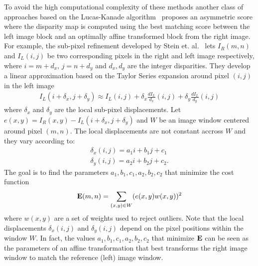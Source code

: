 To avoid the high computational complexity of these methods another
class of approaches based on the Lucas-Kanade
algorithm~\cite{Baker04:lucas-kanade} proposes an asymmetric score
where the disparity map is computed using the best matching score
between the left image block and an optimally affine transformed block
from the right image.  For example, the sub-pixel refinement developed
by Stein et. al.~\cite{Stein06:attenuating} lets $I_R(m,n)$ and
$I_L(i,j)$ be two corresponding pixels in the right and left image
respectively, where $i = m+d_x$, $j = n+d_y$ and $d_x, d_y$ are the
integer disparities.  They develop a linear approximation based on the
Taylor Series expansion around pixel $(i,j)$ in the left image
\begin{eqnarray}
I_L(i+\delta_x,j + \delta_y)\approx I_L(i,j) + \delta_x\frac{dI_L}{d_x}(i,j)+\delta_y\frac{dI_L}{d_y}(i,j) 
\label{taylor_expansion}
\end {eqnarray}
where $\delta_x$ and $\delta_y$ are the local sub-pixel displacements.
Let $e(x,y) = I_R(x,y) - I_L(i+\delta_x,j+\delta_y)$ and $W$ be an
image window centered around pixel $(m,n)$.  The local displacements
are not constant accross $W$ and they vary according to:
\begin{eqnarray}
\nonumber
\delta_x(i,j) = a_1i+b_1j+c_1\\
\delta_y(i,j) = a_2i+b_2j+c_2. 
\label{affine_transform}
\end {eqnarray}
The goal is to find the parameters $a_1, b_1, c_1, a_2, b_2, c_2$ that
minimize the cost function
\begin{eqnarray}
{\bf E}(m,n) =\sum_{(x,y)\in W} (e(x,y)w(x,y))^2
\label{affine2D_cost}
\end{eqnarray}
where $w(x,y)$ are a set of weights used to reject outliers. Note that
the local displacements $\delta_x(i,j)$ and $\delta_y(i,j)$ depend on
the pixel positions within the window $W$. In fact, the values $a_1,
b_1, c_1, a_2, b_2, c_2$ that minimize $\bf E$ can be seen as the
parameters of an affine transformation that best transforms the right
image window to match the reference (left) image window.

 
